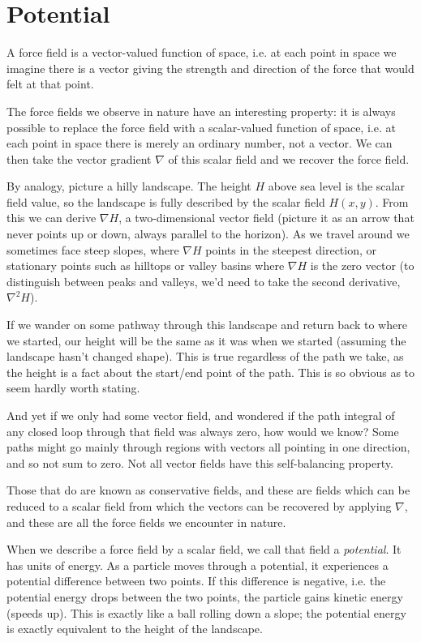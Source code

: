 \chapter{Potential}

A force field is a vector-valued function of space, i.e. at each point in space we imagine there is a vector giving the strength and direction of the force that would felt at that point.

The force fields we observe in nature have an interesting property: it is always possible to replace the force field with a scalar-valued function of space, i.e. at each point in space there is merely an ordinary number, not a vector. We can then take the vector gradient $\nabla$ of this scalar field and we recover the force field.

By analogy, picture a hilly landscape. The height $H$ above sea level is the scalar field value, so the landscape is fully described by the scalar field $H(x, y)$. From this we can derive $\nabla H$, a two-dimensional vector field (picture it as an arrow that never points up or down, always parallel to the horizon). As we travel around we sometimes face steep slopes, where $\nabla H$ points in the steepest direction, or stationary points such as hilltops or valley basins where $\nabla H$ is the zero vector (to distinguish between peaks and valleys, we'd need to take the second derivative, $\nabla^2H$).

If we wander on some pathway through this landscape and return back to where we started, our height will be the same as it was when we started (assuming the landscape hasn't changed shape). This is true regardless of the path we take, as the height is a fact about the start/end point of the path. This is so obvious as to seem hardly worth stating.

And yet if we only had some vector field, and wondered if the path integral of any closed loop through that field was always zero, how would we know? Some paths might go mainly through regions with vectors all pointing in one direction, and so not sum to zero. Not all vector fields have this self-balancing property.

Those that do are known as conservative fields, and these are fields which can be reduced to a scalar field from which the vectors can be recovered by applying $\nabla$, and these are all the force fields we encounter in nature.

When we describe a force field by a scalar field, we call that field a \textit{potential}. It has units of energy. As a particle moves through a potential, it experiences a potential difference between two points. If this difference is negative, i.e. the potential energy drops between the two points, the particle gains kinetic energy (speeds up). This is exactly like a ball rolling down a slope; the potential energy is exactly equivalent to the height of the landscape.

